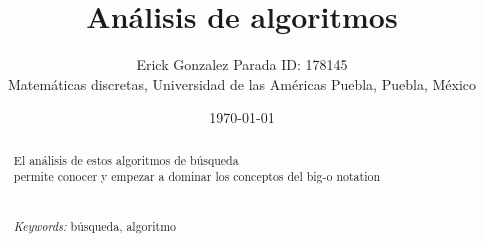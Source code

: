 \documentclass{article}
\begin{document}
\renewcommand{\footrulewidth}{1pt}
\renewcommand{\tablename}{Tabla}
\renewcommand{\figurename}{Figura}


\title{Análisis de algoritmos}
\author{\small{Erick Gonzalez Parada ID: 178145}\\
	   \small{Matemáticas discretas, Universidad de las Américas Puebla, Puebla, M\'exico}}
\date{\small{\today}}
\maketitle


\begin{abstract}
  El análisis de estos algoritmos de búsqueda\\
permite conocer y empezar a dominar los conceptos del big-o notation\\ 
\\
\\
{\it Keywords:}  búsqueda, algoritmo   
\\
\\
\end{abstract}

\end{document}
